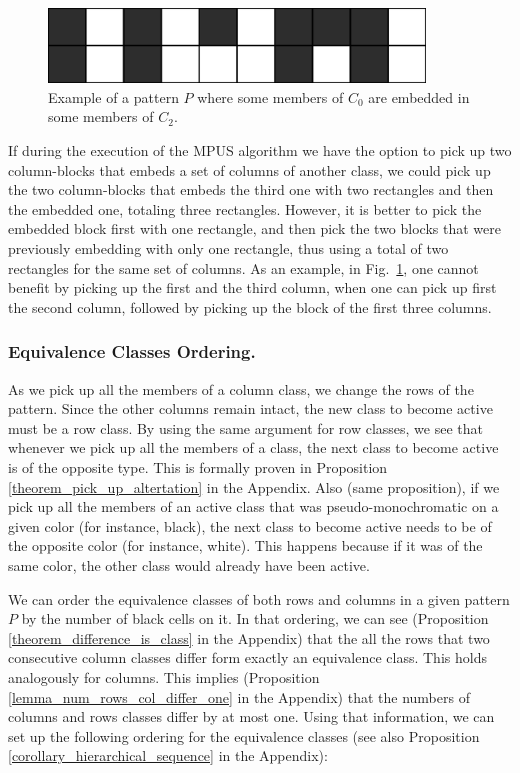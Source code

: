 \begin{figure}[h]
\centering
\includegraphics[width=10cm]{embedment_example}
\caption{Example of a pattern $P$ where some members of $C_{0}$ are embedded in some members of $C_{2}$.}
\label{fig:embedment_example}
\end{figure}

If during the execution of the MPUS algorithm we have the option to pick up two
column-blocks that embeds a set of columns of another class,
 we could pick up the two column-blocks that embeds the third one with
 two rectangles and then the embedded one, totaling three rectangles.
 However, it is better to pick the embedded block first with one rectangle,
and then pick the two blocks that were previously embedding with only one
rectangle, thus using a total of two rectangles for the same set of columns.
As an example, in Fig.~\ref{fig:embedment_example}, one cannot benefit
by picking up the first and the third column, when one can pick up
first the second column, followed by picking up the block of the first three
columns.

\subsubsection{Equivalence Classes Ordering.}
\label{ss_ordering}
As we pick up all the members of a column class, we change the rows of the pattern. Since the other columns remain intact, the new class to become active must be a row class. By using the same argument for row classes, we see that whenever we pick up all the members of a class, the next class to become active is of the opposite type.  This is formally proven in Proposition
\ref{theorem_pick_up_altertation} in the Appendix.
Also (same proposition), if we pick up all the members of an active class that was pseudo-monochromatic on a given color (for instance, black), the next class to become active needs to be of the opposite color (for instance, white). This happens because if it was of the same color, the other class would already have been active.

We can order the equivalence classes of both rows and columns in a given
 pattern $P$ by the number of black cells on it. In that ordering,
we can see (Proposition \ref{theorem_difference_is_class} in the Appendix)
that the all the rows that two consecutive column classes differ
 form exactly an equivalence class. This holds analogously for columns.
This implies (Proposition \ref{lemma_num_rows_col_differ_one} in the Appendix)
that the numbers of columns and rows classes differ
by at most one.  Using that information,
 we can set up the following ordering for the equivalence classes
(see also Proposition \ref{corollary_hierarchical_sequence} in the Appendix):


